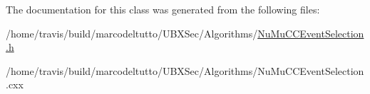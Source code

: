 The documentation for this class was generated from the following files\-:\begin{DoxyCompactItemize}
\item 
/home/travis/build/marcodeltutto/\-U\-B\-X\-Sec/\-Algorithms/\hyperlink{NuMuCCEventSelection_8h}{Nu\-Mu\-C\-C\-Event\-Selection.\-h}\item 
/home/travis/build/marcodeltutto/\-U\-B\-X\-Sec/\-Algorithms/Nu\-Mu\-C\-C\-Event\-Selection.\-cxx\end{DoxyCompactItemize}
